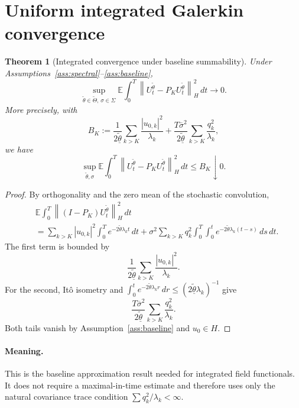 \documentclass[11pt]{article}
\newtheorem{theorem}[assumption]{Theorem}
\theoremstyle{remark}
\newcommand{\E}{\mathbb E}
\newcommand{\1}{\mathbf 1}
\newcommand{\hnorm}[1]{\left\lVert #1\right\rVert_H}
\newcommand{\ThetaI}{\widetilde\Theta}
\newcommand{\thetamin}{\underline{\widetilde\theta}}
\newcommand{\sigmamax}{\overline\sigma}
\begin{document}
\section{Uniform integrated Galerkin convergence}

\begin{theorem}[Integrated convergence under baseline summability]\label{thm:integrated}
Under Assumptions~\ref{ass:spectral}--\ref{ass:baseline},
\begin{equation}\label{eq:intconv}
 \sup_{\widetilde\theta\in\ThetaI,\,\sigma\in\Sigma}
 \E\int_0^T
 \hnorm{U_t^{\widetilde\theta}-P_KU_t^{\widetilde\theta}}^2\,dt
 \longrightarrow0.
\end{equation}
More precisely, with
\begin{equation}\label{eq:BK}
 B_K:=
 \frac{1}{2\thetamin}
 \sum_{k>K}\frac{|u_{0,k}|^2}{\lambda_k}
 +\frac{T\sigmamax^2}{2\thetamin}
 \sum_{k>K}\frac{q_k^2}{\lambda_k},
\end{equation}
we have
\[
 \sup_{\widetilde\theta,\sigma}
 \E\int_0^T
 \hnorm{U_t^{\widetilde\theta}-P_KU_t^{\widetilde\theta}}^2\,dt
 \le B_K\downarrow0.
\]
\end{theorem}

\begin{proof}
By orthogonality and the zero mean of the stochastic convolution,
\begin{align*}
 &\E\int_0^T
 \hnorm{(I-P_K)U_t^{\widetilde\theta}}^2\,dt\\
 &=\sum_{k>K}|u_{0,k}|^2\int_0^T e^{-2\widetilde\theta\lambda_kt}\,dt
 +\sigma^2\sum_{k>K}q_k^2
   \int_0^T\int_0^t e^{-2\widetilde\theta\lambda_k(t-s)}\,ds\,dt.
\end{align*}
The first term is bounded by
\[
 \frac1{2\thetamin}
 \sum_{k>K}\frac{|u_{0,k}|^2}{\lambda_k}.
\]
For the second, It\^o isometry and \(\int_0^t e^{-2\widetilde\theta\lambda_kr}\,dr\le(2\thetamin\lambda_k)^{-1}\) give
\[
 \frac{T\sigmamax^2}{2\thetamin}
 \sum_{k>K}\frac{q_k^2}{\lambda_k}.
\]
Both tails vanish by Assumption~\ref{ass:baseline} and \(u_0\in H\).
\end{proof}

\paragraph{Meaning.}
This is the baseline approximation result needed for integrated field functionals.  It does not require a maximal-in-time estimate and therefore uses only the natural covariance trace condition \(\sum q_k^2/\lambda_k<\infty\).
\end{document}

